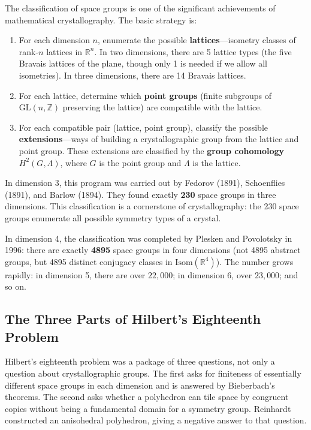The classification of space groups is one of the significant achievements of mathematical crystallography. The basic strategy is:

\begin{enumerate}
    \item For each dimension $n$, enumerate the possible \textbf{lattices}---isometry classes of rank-$n$ lattices in $\mathbb{R}^n$. In two dimensions, there are 5 lattice types (the five Bravais lattices of the plane, though only 1 is needed if we allow all isometries). In three dimensions, there are 14 Bravais lattices.

    \item For each lattice, determine which \textbf{point groups} (finite subgroups of $\mathrm{GL}(n, \mathbb{Z})$ preserving the lattice) are compatible with the lattice.

    \item For each compatible pair (lattice, point group), classify the possible \textbf{extensions}---ways of building a crystallographic group from the lattice and point group. These extensions are classified by the \textbf{group cohomology} $H^2(G, \Lambda)$, where $G$ is the point group and $\Lambda$ is the lattice.
\end{enumerate}

In dimension 3, this program was carried out by Fedorov (1891), Schoenflies (1891), and Barlow (1894). They found exactly \textbf{230} space groups in three dimensions. This classification is a cornerstone of crystallography: the 230 space groups enumerate all possible symmetry types of a crystal.

In dimension 4, the classification was completed by Plesken and Povolotsky in 1996: there are exactly \textbf{4895} space groups in four dimensions (not 4895 abstract groups, but 4895 distinct conjugacy classes in $\mathrm{Isom}(\mathbb{R}^4)$). The number grows rapidly: in dimension 5, there are over $22{,}000$; in dimension 6, over $23{,}000$; and so on.

\subsection{The Three Parts of Hilbert's Eighteenth Problem}

Hilbert's eighteenth problem was a package of three questions, not only a question about crystallographic groups. The first asks for finiteness of essentially different space groups in each dimension and is answered by Bieberbach's theorems. The second asks whether a polyhedron can tile space by congruent copies without being a fundamental domain for a symmetry group. Reinhardt constructed an anisohedral polyhedron, giving a negative answer to that question.

